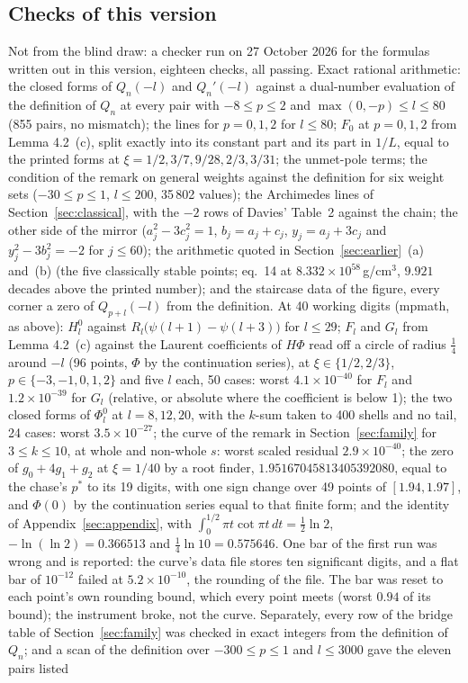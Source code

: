 \documentclass[11pt]{article}
\begin{document}
\par\endgroup

\subsection{Checks of this version}\label{sec:r5check}

Not from the blind draw: a checker run on 27 October 2026 for the formulas written out in this version, eighteen checks, all passing. Exact rational arithmetic: the closed forms of $Q_n(-l)$ and $Q_n'(-l)$ against a dual-number evaluation of the definition of $Q_n$ at every pair with $-8\le p\le2$ and $\max(0,-p)\le l\le80$ (855 pairs, no mismatch); the lines for $p=0,1,2$ for $l\le80$; $F_0$ at $p=0,1,2$ from Lemma 4.2~(c), split exactly into its constant part and its part in $1/L$, equal to the printed forms at $\xi=1/2,3/7,9/28,2/3,3/31$; the unmet-pole terms; the condition of the remark on general weights against the definition for six weight sets ($-30\le p\le1$, $l\le200$, 35\,802 values); the Archimedes lines of Section~\ref{sec:classical}, with the $-2$ rows of Davies' Table~2 against the chain; the other side of the mirror ($a_j^2-3c_j^2=1$, $b_j=a_j+c_j$, $y_j=a_j+3c_j$ and $y_j^2-3b_j^2=-2$ for $j\le60$); the arithmetic quoted in Section~\ref{sec:earlier}~(a) and~(b) (the five classically stable points; eq.~14 at $8.332\times10^{58}$\,g/cm$^3$, $9.921$ decades above the printed number); and the staircase data of the figure, every corner a zero of $Q_{p+l}(-l)$ from the definition. At 40 working digits (mpmath, as above): $H^0_l$ against $R_l\bigl(\psi(l+1)-\psi(l+3)\bigr)$ for $l\le29$; $F_l$ and $G_l$ from Lemma 4.2~(c) against the Laurent coefficients of $H\Phi$ read off a circle of radius $\frac14$ around $-l$ (96 points, $\Phi$ by the continuation series), at $\xi\in\{1/2,2/3\}$, $p\in\{-3,-1,0,1,2\}$ and five $l$ each, 50 cases: worst $4.1\times10^{-40}$ for $F_l$ and $1.2\times10^{-39}$ for $G_l$ (relative, or absolute where the coefficient is below 1); the two closed forms of $\Phi^0_l$ at $l=8,12,20$, with the $k$-sum taken to 400 shells and no tail, 24 cases: worst $3.5\times10^{-27}$; the curve of the remark in Section~\ref{sec:family} for $3\le k\le10$, at whole and non-whole $s$: worst scaled residual $2.9\times10^{-40}$; the zero of $g_0+4g_1+g_2$ at $\xi=1/40$ by a root finder, $1.95167045813405392080$, equal to the chase's $p^*$ to its 19 digits, with one sign change over 49 points of $[1.94,1.97]$, and $\Phi(0)$ by the continuation series equal to that finite form; and the identity of Appendix~\ref{sec:appendix}, with $\int_0^{1/2}\pi t\cot\pi t\,dt=\frac12\ln2$, $-\ln(\ln2)=0.366513$ and $\frac14\ln10=0.575646$. One bar of the first run was wrong and is reported: the curve's data file stores ten significant digits, and a flat bar of $10^{-12}$ failed at $5.2\times10^{-10}$, the rounding of the file. The bar was reset to each point's own rounding bound, which every point meets (worst $0.94$ of its bound); the instrument broke, not the curve. Separately, every row of the bridge table of Section~\ref{sec:family} was checked in exact integers from the definition of $Q_n$; and a scan of the definition over $-300\le p\le1$ and $l\le3000$ gave the eleven pairs listed 
\end{document}

